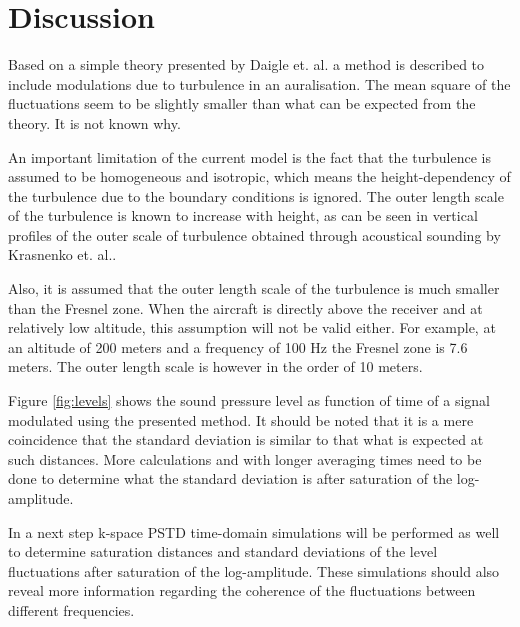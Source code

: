 \section{Discussion}
Based on a simple theory presented by Daigle et. al. a method is described to include modulations due to turbulence in an auralisation.
The mean square of the fluctuations seem to be slightly smaller than what can be expected from the theory. It is not known why.

An important limitation of the current model is the fact that the turbulence is assumed to be homogeneous and isotropic, which means the height-dependency of the turbulence due to the boundary conditions is ignored.
The outer length scale of the turbulence is known to increase with height, as can be seen in 
vertical profiles of the outer scale of turbulence obtained through acoustical sounding by Krasnenko et. al.\cite{Krasnenko2013}.

Also, it is assumed that the outer length scale of the turbulence is much smaller than the Fresnel zone. When the aircraft is directly above the receiver and at relatively low altitude, this assumption will not be valid either.
For example, at an altitude of 200 meters and a frequency of 100 Hz the Fresnel zone is 7.6 meters. The outer length scale is however in the order of 10 meters.

Figure \ref{fig:levels} shows the sound pressure level as function of time of a signal modulated using the presented method.
It should be noted that it is a mere coincidence that the standard deviation is similar to that what is expected at such distances.
More calculations and with longer averaging times need to be done to determine what the standard deviation is after saturation of the log-amplitude.

In a next step k-space PSTD time-domain simulations will be performed as well to determine saturation distances and standard deviations of the level fluctuations after saturation of the log-amplitude.
These simulations should also reveal more information regarding the coherence of the fluctuations between different frequencies.


